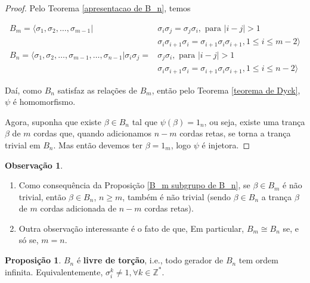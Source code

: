 \documentclass[a4paper,portuguese,11pt,twoside, leqno]{book}
\theoremstyle{definition}
\newtheorem{remark}{Observação}[section]
\newtheorem{prop}{Proposição}[section]
\begin{document}
	
	\begin{proof}
		Pelo Teorema \eqref{apresentacao de B_n}, temos
		
		\begin{align*}
		B_m = \langle \sigma_1, \sigma_2, \dots, \sigma_{m-1} | &\sigma_i\sigma_j = \sigma_j\sigma_i, \text{ para }|i-j|>1 \\ 
		&\sigma_i\sigma_{i+1}\sigma_i = \sigma_{i+1}\sigma_i\sigma_{i+1}, 1\leq i\leq m-2\rangle \\
		B_n = \langle \sigma_1, \sigma_2, \dots, \sigma_{m-1}, \dots, \sigma_{n-1} | \sigma_i\sigma_j = &\sigma_j\sigma_i, \text{ para }|i-j|>1 \\ 
		&\sigma_i\sigma_{i+1}\sigma_i = \sigma_{i+1}\sigma_i\sigma_{i+1}, 1\leq i\leq n-2\rangle
		\end{align*} 
		
		\par\vspace{0.3cm} Daí, como $B_n$ satisfaz as relações de $B_m$, então pelo Teorema \eqref{teorema de Dyck}, $\psi$ é homomorfismo.
		
		\par\vspace{0.3cm} Agora, suponha que existe $\beta\in B_n$ tal que $\psi(\beta) = 1_n$, ou seja, existe uma trança $\beta$ de $m$ cordas que, quando adicionamos $n-m$ cordas retas, se torna a trança trivial em $B_n$. Mas então devemos ter $\beta = 1_m$, logo $\psi$ é injetora.
		
	\end{proof}
	
	\begin{remark}
		\begin{enumerate}
			\item Como consequência da Proposição \eqref{B_m subgrupo de B_n}, se $\beta\in B_m$ é não trivial, então $\beta\in B_n$, $n\geq m$, também é não trivial (sendo $\beta\in B_n$ a trança $\beta$ de $m$ cordas adicionada de $n-m$ cordas retas).
			\item Outra observação interessante é o fato de que, Em particular, $B_m\cong B_n$ se, e só se, $m=n$.
		\end{enumerate}
	\end{remark}
	
	\begin{prop}
		\label{geradores de B_n tem ordem infinita}
		$B_n$ é \textbf{livre de torção}, i.e., todo gerador de $B_n$ tem ordem infinita. Equivalentemente, $\sigma_i^k \neq 1, \forall k\in\mathbb{Z}^{\ast}$.
	\end{prop}
	
\end{document}
